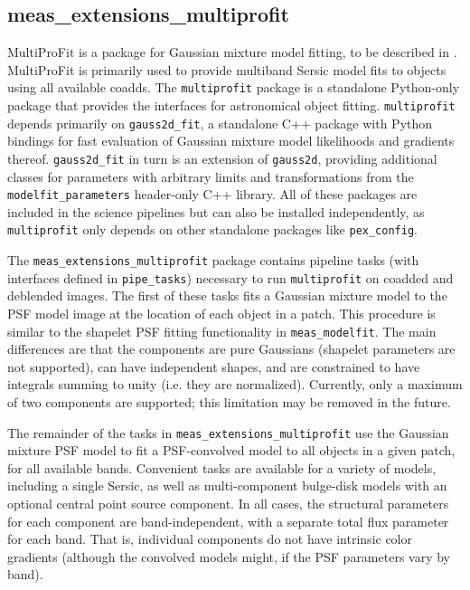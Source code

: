 \subsection{meas\_extensions\_multiprofit}
\label{sec:meas_extensions_multiprofit}

MultiProFit is a package for Gaussian mixture model fitting, to be described in \citep{DMTN-312}.
MultiProFit is primarily used to provide multiband Sersic model fits to objects using all available coadds.
The \texttt{multiprofit} package is a standalone Python-only package that provides the interfaces for astronomical object fitting.
\texttt{multiprofit} depends primarily on \texttt{gauss2d\_fit}, a standalone C++ package with Python bindings for fast evaluation of Gaussian mixture model likelihoods and gradients thereof.
\texttt{gauss2d\_fit} in turn is an extension of \texttt{gauss2d}, providing additional classes for parameters with arbitrary limits and transformations from the \texttt{modelfit\_parameters} header-only C++ library.
All of these packages are included in the science pipelines but can also be installed independently, as \texttt{multiprofit} only depends on other standalone packages like \texttt{pex\_config}.

The \texttt{meas\_extensions\_multiprofit} package contains pipeline tasks (with interfaces defined in \texttt{pipe\_tasks}) necessary to run \texttt{multiprofit} on coadded and deblended images.
The first of these tasks fits a Gaussian mixture model to the PSF model image at the location of each object in a patch.
This procedure is similar to the shapelet PSF fitting functionality in \texttt{meas\_modelfit}.
The main differences are that the components are pure Gaussians (shapelet parameters are not supported), can have independent shapes, and are constrained to have integrals summing to unity (i.e. they are normalized).
Currently, only a maximum of two components are supported; this limitation may be removed in the future.

The remainder of the tasks in \texttt{meas\_extensions\_multiprofit} use the Gaussian mixture PSF model to fit a PSF-convolved model to all objects in a given patch, for all available bands.
Convenient tasks are available for a variety of models, including a single Sersic, as well as multi-component bulge-disk models with an optional central point source component.
In all cases, the structural parameters for each component are band-independent, with a separate total flux parameter for each band.
That is, individual components do not have intrinsic color gradients (although the convolved models might, if the PSF parameters vary by band).
